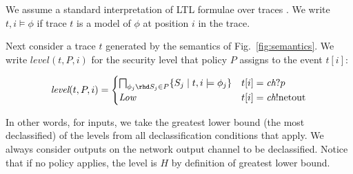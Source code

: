 \documentclass{entcs} \usepackage{entcsmacro}
\newcommand{\code}[1]{\text{\lstinline!#1!}}
\newcommand{\aset}[1]{\{#1\}}
\newcommand{\sch}{\textit{ch}}
\newcommand{\tr}{t\xspace}
\newcommand{\tfuture}{\mathcal{F}}
\newcommand{\tlevel}[3]{\textit{level}(#1, #2, #3)}
\begin{document}



We assume a standard interpretation of LTL formulae over
traces \cite{Lichtenstein:85}.
We write $\tr, i \models \phi$ if trace $\tr$ is a model of $\phi$ at
position $i$ in the trace.

Next consider a trace $\tr$ generated by the semantics of
Fig.~\ref{fig:semantics}. We write $\tlevel{\tr}{P}{i}$ for the
security level that policy $P$ assigns to the event $\tr[i]$:

\begin{displaymath}
  \tlevel{\tr}{P}{i} =
  \begin{cases}
    \bigsqcap_{\phi_j\rhd S_j \in P} \aset{ S_j \mid \tr, i \models
      \phi_j } & \tr[i] = \sch?p \\
    \textit{Low} & \tr[i] = \sch!\code{netout} \\
  \end{cases}
\end{displaymath}

In other words, for inputs, we take the greatest lower bound (the most
declassified) of the levels from all declassification conditions that
apply. We always consider outputs on the network output channel to be
declassified. Notice that if no policy applies, the level is $H$ by
definition of greatest lower bound.
\end{document}

